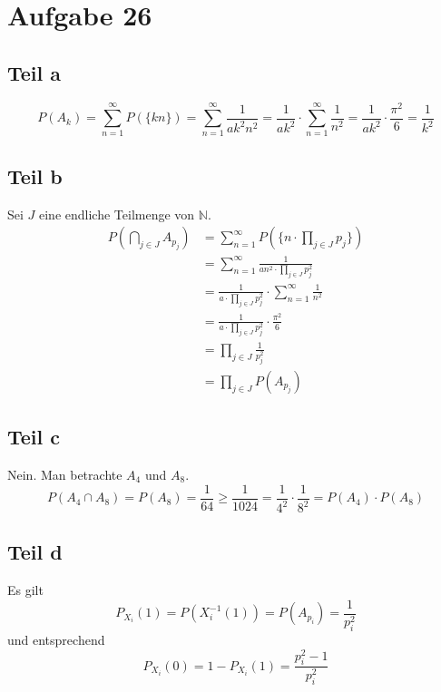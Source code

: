 \documentclass[10pt,a4paper]{article}
\begin{document}
\section{Aufgabe 26}

\subsection{Teil a}
\begin{equation}
  P(A_{k}) = \sum_{n = 1}^{\infty} P(\{kn\}) = \sum_{n = 1}^{\infty} \frac{1}{a k^{2} n^{2}} = \frac{1}{ak^{2}} \cdot \sum_{n = 1}^{\infty} \frac{1}{n^{2}} = \frac{1}{ak^{2}} \cdot \frac{\pi^{2}}{6} = \frac{1}{k^{2}}
\end{equation}

\subsection{Teil b}
Sei $J$ eine endliche Teilmenge von $\mathbb{N}$.
\begin{align*}
  P(\bigcap_{j \in J} A_{p_{j}}) & = \sum_{n = 1}^{\infty} P(\{ n \cdot \prod_{j \in J} p_{j} \})\\
  & = \sum_{n = 1}^{\infty} \frac{1}{an^{2} \cdot \prod_{j \in J} p_{j}^{2}}\\
  & = \frac{1}{a \cdot \prod_{j \in J} p_{j}^{2}} \cdot \sum_{n = 1}^{\infty} \frac{1}{n^{2}}\\
  & = \frac{1}{a \cdot \prod_{j \in J} p_{j}^{2}} \cdot \frac{\pi^{2}}{6}\\
  & = \prod_{j \in J} \frac{1}{p_{j}^{2}}\\
  & = \prod_{j \in J} P(A_{p_{j}})
\end{align*}

\subsection{Teil c}
Nein.
Man betrachte $A_{4}$ und $A_{8}$.
\begin{equation}
  P(A_{4} \cap A_{8}) = P(A_{8}) = \frac{1}{64} \ge \frac{1}{1024} = \frac{1}{4^{2}} \cdot \frac{1}{8^{2}} = P(A_{4}) \cdot P(A_{8})
\end{equation}

\subsection{Teil d}
Es gilt
\begin{equation}
  P_{X_{i}}(1) = P(X_{i}^{-1}(1)) = P(A_{p_{i}}) = \frac{1}{p_{i}^{2}}
\end{equation}
und entsprechend
\begin{equation}
  P_{X_{i}}(0) = 1 - P_{X_{i}}(1) = \frac{p_{i}^{2} - 1}{p_{i}^{2}}
\end{equation}
\end{document}
